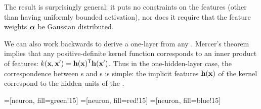 The result is surprisingly general:
it puts no constraints on the features (other than having uniformly bounded activation), nor does it require that the feature weights $\boldsymbol{\alpha}$ be Gaussian distributed.  

We can also work backwards to derive a one-layer \MLP{} from any \gp{}.
Mercer's theorem implies that any positive-definite kernel function corresponds to an inner product of features: $k({\bf{x}}, {\bf{x}}') = {\bf{h}}({\bf{x}}) ^{\mathsf{T}} {\bf{h}}({\bf{x}}')$.
%
Thus in the one-hidden-layer case, the correspondence between \MLP{}s and \gp{}s is simple:
the implicit features ${\bf{h}}({\bf{x}})$ of the kernel correspond to the hidden units of the \MLP{}.




\newcommand{\numdims}[0]{3}
\newcommand{\numhidden}[0]{3}
\newcommand{\upnodedist}[0]{1cm}
\newcommand{\bardist}[0]{\hspace{-0.2cm}}

\def\layersep{2.3cm}
\def\nodesep{1.3cm}
\def\nodesize{1cm}


\newcommand{\neuronfunc}[2]{
\FPeval{\result}{clip(#1+#2)}
\texttt{[image: ../figures/deep-limits/two-d-draws/sqexp-draw-\\result]}
}

=[neuron, fill=green!15]
=[neuron, fill=red!15]
=[neuron, fill=blue!15]

\newcommand{\indfeat}{h}

